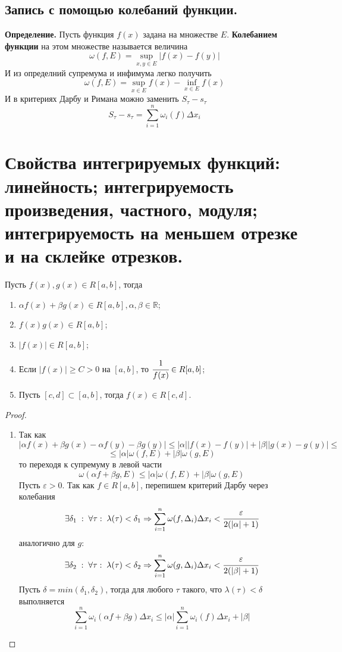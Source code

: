 \documentclass{article}
\newcommand*{\definition}[1]{\textbf{Определение.} #1 \newline}
\newcommand*{\R}{\mathbb{R}}
\begin{document}
\subsection{Запись с помощью колебаний функции.}
\definition{Пусть функция $f(x)$ задана на множестве $E$. \textbf{Колебанием функции} на этом множестве называется величина}
$$
    \omega(f, E) = \displaystyle \sup_{x, y \in E}|f(x) - f(y)|
$$
И из определний супремума и инфимума легко получить 
$$
    \omega(f, E) = \displaystyle \sup_{x \in E}f(x) - \inf_{x \in E}f(x)
$$
И в критериях Дарбу и Римана можно заменить $S_\tau - s_\tau$
$$
    S_\tau - s_\tau = \sum_{i = 1}^{n}\omega_i(f)\Delta x_i
$$
\section{Свойства интегрируемых функций: линейность; интегрируемость произведения, частного, модуля; интегрируемость на меньшем отрезке и на склейке отрезков.}
Пусть $f(x), g(x) \in R[a, b]$, тогда 
\begin{enumerate}
    \item $\alpha f(x) + \beta g(x) \in R[a, b], \alpha, \beta \in \R$;
    \item $f(x)g(x) \in R[a, b]$;
    \item $|f(x)| \in R[a, b]$;
    \item Если $|f(x)| \geq C > 0$ на $[a, b]$, то $\cfrac{1}{f(x)} \in R[a, b]$;
    \item Пусть $[c, d] \subset [a, b]$, тогда $f(x) \in R[c, d]$.
\end{enumerate}
\begin{proof}
    \begin{enumerate}
        \item Так как
        $$
            |\alpha f(x) + \beta g(x) - \alpha f(y) - \beta g(y)| \leq |\alpha||f(x) - f(y)| + |\beta||g(x) - g(y)| \leq 
        $$  
        $$
            \leq |\alpha|\omega(f, E) + |\beta|\omega(g, E)
        $$
        то переходя к супремуму в левой части
        $$
            \omega(\alpha f + \beta g, E) \leq |\alpha|\omega(f, E) + |\beta|\omega(g, E)
        $$
        Пусть $\varepsilon > 0$. Так как $f \in R[a, b]$, перепишем критерий Дарбу через колебания
        $$
            \exists \delta_1 \; : \; \forall \tau: \; \lambda(\tau) < \delta_1 \Rightarrow \sum_{i = 1}^{n} \omega(f, \Delta_i)\Delta x_i < \cfrac{\varepsilon}{2(|\alpha| + 1)}        
        $$
        аналогично для $g$:
        $$
            \exists \delta_2 \; : \; \forall \tau: \; \lambda(\tau) < \delta_2 \Rightarrow \sum_{i = 1}^{n} \omega(g, \Delta_i)\Delta x_i < \cfrac{\varepsilon}{2(|\beta| + 1)}        
        $$  
        Пусть $\delta = min(\delta_1, \delta_2)$, тогда для любого $\tau$ такого, что $\lambda(\tau) < \delta$ выполняется
        $$
            \sum_{i = 1}^{n} \omega_i (\alpha f + \beta g)\Delta x_i \leq |\alpha| \sum_{i = 1}^{n} \omega_i(f)\Delta x_i + |\beta|
        $$
    \end{enumerate}
\end{proof}
\end{document}

